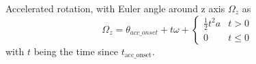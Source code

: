 Accelerated rotation, with Euler angle around z axis $\Omega_z$ as
\begin{equation}
  \Omega_z = \theta_{acc\_onset} + t \omega + \left\{\begin{array}{ll} \frac12 t^2 a & t > 0\\0 & t \le 0
  \end{array}\right.
\end{equation}
with $t$ being the time since $t_\textrm{acc\_onset}$.




